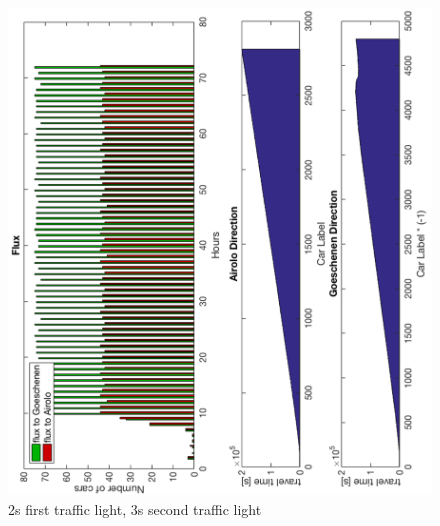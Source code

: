 \documentclass[11pt,a4paper,parskip=half-]{article}
\begin{document}
\begin{figure}[h!]
\includegraphics[scale=0.88]{2_3_3g}
\centering
\vspace*{-4mm}
\caption{2s first traffic light, 3s second traffic light}
\label{fig:2_3_3g}
\end{figure}
\end{document}
